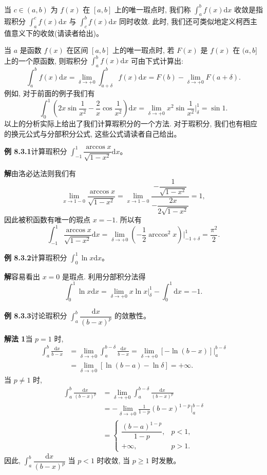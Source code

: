 \documentclass[UTF8, 12pt, fontset=fandol, oneside]{ctexart}
\begin{document}
当 $c\in(a,b)$ 为 $f(x)$ 在 $[a,b]$ 上的唯一瑕点时, 我们称 $\int_a^b f(x)\mathrm dx$ 收敛是指瑕积分 $\int_a^c f(x)\mathrm dx$ 与 $\int_c^b f(x)\mathrm dx$ 同时收敛. 此时, 我们还可类似地定义柯西主值意义下的收敛(请读者给出)。

当 $a$ 是函数 $f(x)$ 在区间 $[a,b]$ 上的唯一瑕点时, 若 $F(x)$ 是 $f(x)$ 在 $(a,b]$ 上的一个原函数, 则瑕积分 $\int_a^b f(x)\mathrm dx$ 可由下式计算出:
\[
  \int_a^b f(x)\mathrm dx
  =
  \lim_{\delta\to+0}\int_{a+\delta}^b f(x)\mathrm dx
  =
  F(b)-\lim_{\delta\to+0}F(a+\delta).
\]
例如, 对于前面的例子我们有
\[
  \int_0^1\left(2x\sin\frac1{x^2}-\frac2x\cos\frac1{x^2}\right)\mathrm dx
  =
  \lim_{\delta\to+0}x^2\sin\frac1{x^2}\bigg|_\delta^1
  =
  \sin1.
\]
以上的分析实际上给出了我们计算瑕积分的一个方法. 对于瑕积分, 我们也有相应的换元公式与分部积分公式, 这些公式请读者自己给出。

\noindent\textbf{例 8.3.1}\quad 计算瑕积分 $\int_{-1}^1\dfrac{\arccos x}{\sqrt{1-x^2}}\mathrm dx$。

\noindent\textbf{解}\quad 由洛必达法则我们有
\[
  \lim_{x\to1-0}\frac{\arccos x}{\sqrt{1-x^2}}
  =
  \lim_{x\to1-0}
  \frac{-\dfrac1{\sqrt{1-x^2}}}{-\dfrac{2x}{2\sqrt{1-x^2}}}
  =
  1,
\]
因此被积函数有唯一的瑕点 $x=-1$. 所以有
\[
  \int_{-1}^1\frac{\arccos x}{\sqrt{1-x^2}}\mathrm dx
  =
  \lim_{\delta\to+0}\left(-\frac12\arccos^2x\right)\bigg|_{-1+\delta}^1
  =
  \frac{\pi^2}{2}.
\]

\noindent\textbf{例 8.3.2}\quad 计算瑕积分 $\int_0^1\ln x\mathrm dx$。

\noindent\textbf{解}\quad 容易看出 $x=0$ 是瑕点. 利用分部积分法得
\[
  \int_0^1\ln x\mathrm dx
  =
  \lim_{\delta\to+0}x\ln x\big|_\delta^1
  -
  \int_0^1\mathrm dx
  =
  -1.
\]

\noindent\textbf{例 8.3.3}\quad 讨论瑕积分 $\int_a^b\dfrac{\mathrm dx}{(b-x)^p}$ 的敛散性。

\noindent\textbf{解法 1}\quad 当 $p=1$ 时,
\[
\begin{aligned}
  \int_a^b\frac{\mathrm dx}{b-x}
  &=
  \lim_{\delta\to+0}\int_a^{b-\delta}\frac{\mathrm dx}{b-x}
  =
  \lim_{\delta\to+0}[-\ln(b-x)]\big|_a^{b-\delta}\\
  &=
  \lim_{\delta\to+0}[\ln(b-a)-\ln\delta]=+\infty.
\end{aligned}
\]
当 $p\ne1$ 时,
\[
\begin{aligned}
  \int_a^b\frac{\mathrm dx}{(b-x)^p}
  &=
  \lim_{\delta\to+0}\int_a^{b-\delta}\frac{\mathrm dx}{(b-x)^p}\\
  &=
  -\lim_{\delta\to+0}\frac1{1-p}(b-x)^{1-p}\bigg|_a^{b-\delta}\\
  &=
  \begin{cases}
    \dfrac{(b-a)^{1-p}}{1-p}, & p<1,\\
    +\infty, & p>1.
  \end{cases}
\end{aligned}
\]
因此, $\int_a^b\dfrac{\mathrm dx}{(b-x)^p}$ 当 $p<1$ 时收敛, 当 $p\geq1$ 时发散。
\end{document}
